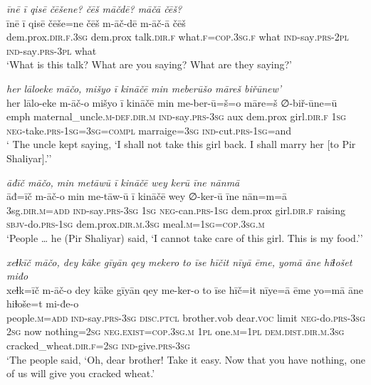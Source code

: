 \ea \label{ŽP.223}
\textit{īnē ī qisē čēšene? čēš māčdē? māčā čēš?} \\ 
\gll īnē ī qisē čēše=ne čēš m-āč-dē m-āč-ā čēš \\ 
 dem.prox\textsc{.dir}\textsc{.f}\textsc{.3sg} dem.prox talk\textsc{.dir}\textsc{.f} what\textsc{.f}\textsc{=cop}\textsc{.3sg}\textsc{.f} what \textsc{ind-}say\textsc{.prs}-\textsc{2pl} \textsc{ind-}say\textsc{.prs}\textsc{-3pl} what \\ 
\glt `What is this talk? What are you saying? What are they saying?'
\z 
 
\ea \label{ŽP.225}
\textit{her lāloeke māčo, mišyo ī kināčē min meberūšo māreš biřūnew’} \\ 
\gll her lālo-eke m-āč-o mišyo ī kināčē min me-ber-ū=š=o māre=š ∅-biř-ūne=ū \\ 
 emph maternal\_uncle\textsc{.m}\textsc{-def}\textsc{.dir}\textsc{.m} \textsc{ind-}say\textsc{.prs}\textsc{-3sg} aux dem.prox girl\textsc{.dir}\textsc{.f} \textsc{1sg} \textsc{neg-}take\textsc{.prs}\textsc{-\textsc{1sg}}\textsc{=3sg}\textsc{=compl} marraige\textsc{=3sg} \textsc{ind-}cut\textsc{.prs}\textsc{-\textsc{1sg}}=and \\ 
\glt ` The uncle kept saying, ‘I shall not take this girl back. I shall marry her [to Pir Shaliyar].’'
\z 
 
\ea \label{ŽP.226}
\textit{āđīč māčo, min metāwū ī kināčē wey kerū īne nānmā} \\ 
\gll āđ=īč m-āč-o min me-tāw-ū ī kināčē wey ∅-ker-ū īne nān=m=ā \\ 
 3sg\textsc{.dir}\textsc{.m}\textsc{=add} \textsc{ind-}say\textsc{.prs}\textsc{-3sg} \textsc{1sg} \textsc{neg-}can\textsc{.prs}\textsc{-\textsc{1sg}} dem.prox girl\textsc{.dir}\textsc{.f} raising \textsc{sbjv-}do\textsc{.prs}\textsc{-\textsc{1sg}} dem.prox\textsc{.dir}\textsc{.m}\textsc{.3sg} meal\textsc{.m}\textsc{=\textsc{1sg}}\textsc{=cop}\textsc{.3sg}\textsc{.m} \\ 
\glt `People … he (Pir Shaliyar) said, ‘I cannot take care of this girl. This is my food.’'
\z 
 
\ea \label{ŽP.227}
\textit{xeɫkīč māčo, dey kāke gīyān qey mekero to īse hīčit nīyā ēme, yomā āne hiɫošet miđo} \\ 
\gll xeɫk=īč m-āč-o dey kāke gīyān qey me-ker-o to īse hīč=it nīye=ā ēme yo=mā āne hiɫoše=t mi-đe-o \\ 
 people\textsc{.m}\textsc{=add} \textsc{ind-}say\textsc{.prs}\textsc{-3sg} \textsc{disc.ptcl} brother.vob dear.\textsc{voc} limit \textsc{neg-}do\textsc{.prs}\textsc{-3sg} \textsc{2sg} now nothing\textsc{=\textsc{2sg}} \textsc{\textsc{neg.}exist}\textsc{=cop}\textsc{.3sg}\textsc{.m} \textsc{1pl} one\textsc{.m}\textsc{=1pl} \textsc{dem.dist}\textsc{.dir}\textsc{.m}\textsc{.3sg} cracked\_wheat\textsc{.dir}\textsc{.f}\textsc{=\textsc{2sg}} \textsc{ind-}give\textsc{.prs}\textsc{-3sg} \\ 
\glt `The people said, ‘Oh, dear brother! Take it easy. Now that you have nothing, one of us will give you cracked wheat.'
\z 
 
